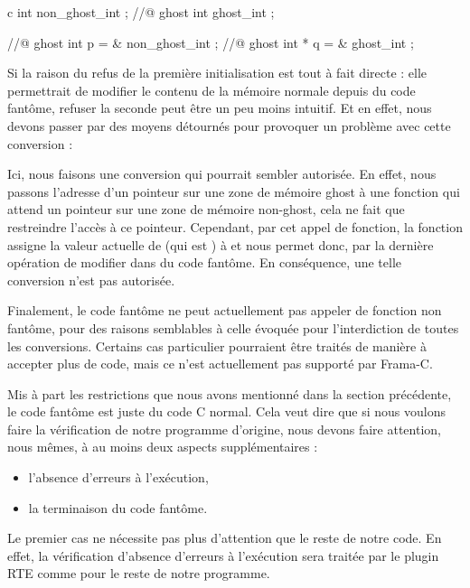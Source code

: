 \begin{CodeBlock}{c}
int non_ghost_int ;
//@ ghost int ghost_int ;

//@ ghost int \ghost * p = & non_ghost_int ;
//@ ghost int * q = & ghost_int ;
\end{CodeBlock}


Si la raison du refus de la première initialisation est tout à fait directe : elle
permettrait de modifier le contenu de la mémoire normale depuis du code fantôme,
refuser la seconde peut être un peu moins intuitif. Et en effet, nous devons passer
par des moyens détournés pour provoquer un problème avec cette conversion :




Ici, nous faisons une conversion qui pourrait sembler autorisée. En effet, nous
passons l'adresse d'un pointeur sur une zone de mémoire ghost à une fonction qui
attend un pointeur sur une zone de mémoire non-ghost, cela ne fait que restreindre
l'accès à ce pointeur. Cependant, par cet appel de fonction, la fonction
 assigne la valeur actuelle de  (qui est
) à  et nous permet donc, par la dernière opération
de modifier  dans du code fantôme. En conséquence, une telle
conversion n'est pas autorisée.


Finalement, le code fantôme ne peut actuellement pas appeler de fonction non
fantôme, pour des raisons semblables à celle évoquée pour l'interdiction de toutes
les conversions. Certains cas particulier pourraient être traités de manière à
accepter plus de code, mais ce n'est actuellement pas supporté par Frama-C.


\label{l3:acsl-logic-definitions-what-remains}


Mis à part les restrictions que nous avons mentionné dans la section précédente,
le code fantôme est juste du code C normal. Cela veut dire que si nous voulons
faire la vérification de notre programme d'origine, nous devons faire attention,
nous mêmes, à au moins deux aspects supplémentaires :


\begin{itemize}
\item l'absence d'erreurs à l'exécution,
\item la terminaison du code fantôme.
\end{itemize}


Le premier cas ne nécessite pas plus d'attention que le reste de notre code.
En effet, la vérification d'absence d'erreurs à l'exécution sera traitée par
le plugin RTE comme pour le reste de notre programme.



